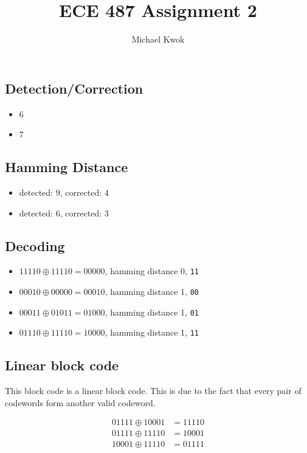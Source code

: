 \documentclass{article}
\title{ECE 487 Assignment 2}
\author{Michael Kwok}
\begin{document}
\maketitle
\subsection*{Detection/Correction}
\begin{itemize}
    \item 6
    \item 7
\end{itemize}

\subsection*{Hamming Distance}
\begin{itemize}
    \item detected: 9, corrected: 4
    \item detected: 6, corrected: 3
\end{itemize}

\subsection*{Decoding}
\begin{itemize}
    \item \(11110 \oplus 11110 = 00000\), hamming distance 0, \verb|11|
    \item \(00010 \oplus 00000 = 00010\), hamming distance 1, \verb|00|
    \item \(00011 \oplus 01011 = 01000\), hamming distance 1, \verb|01|
    \item \(01110 \oplus 11110 = 10000\), hamming distance 1, \verb|11|
\end{itemize}

\subsection*{Linear block code}

This block code is a linear block code. This is due to the fact that every pair of codewords form another valid codeword.

\begin{align*}
    01111 \oplus 10001 & = 11110 \\
    01111 \oplus 11110 & = 10001 \\
    10001 \oplus 11110 & = 01111 \\
\end{align*}
\end{document}
